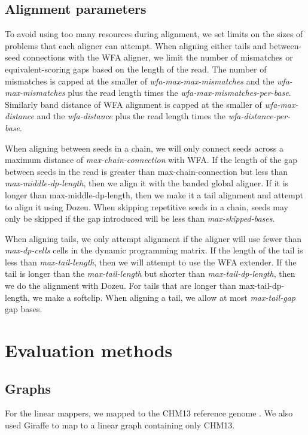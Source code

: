 \documentclass[11pt]{ucscthesis}
\begin{document}
\subsection{Alignment parameters}

To avoid using too many resources during alignment, we set limits on the sizes of problems that each aligner can attempt.
When aligning either tails and between-seed connections with the WFA aligner, we limit the number of mismatches or equivalent-scoring gaps based on the length of the read.
The number of mismatches is capped at the smaller of \emph{wfa-max-max-mismatches} and the \emph{wfa-max-mismatches} plus the read length times the \emph{wfa-max-mismatches-per-base}.
Similarly band distance of WFA alignment is capped at the smaller of \emph{wfa-max-distance} and the \emph{wfa-distance} plus the read length times the \emph{wfa-distance-per-base}.

When aligning between seeds in a chain, we will only connect seeds across a maximum distance of \emph{max-chain-connection} with WFA.
If the length of the gap between seeds in the read is greater than max-chain-connection but less than \emph{max-middle-dp-length}, then we align it with the banded global aligner.
If it is longer than max-middle-dp-length, then we make it a tail alignment and attempt to align it using Dozeu.
When skipping repetitive seeds in a chain, seeds may only be skipped if the gap introduced will be less than \emph{max-skipped-bases}.

When aligning tails, we only attempt alignment if the aligner will use fewer than \emph{max-dp-cells} cells in the dynamic programming matrix.
If the length of the tail is less than \emph{max-tail-length}, then we will attempt to use the WFA extender.
If the tail is longer than the \emph{max-tail-length} but shorter than \emph{max-tail-dp-length}, then we do the alignment with Dozeu.
For tails that are longer than max-tail-dp-length, we make a softclip.
When aligning a tail, we allow at most \emph{max-tail-gap} gap bases.




\section{Evaluation methods}

\subsection{Graphs}
For the linear mappers, we mapped to the CHM13 reference genome \cite{nurk_complete_2022}.
We also used Giraffe to map to a linear graph containing only CHM13.
\end{document}
